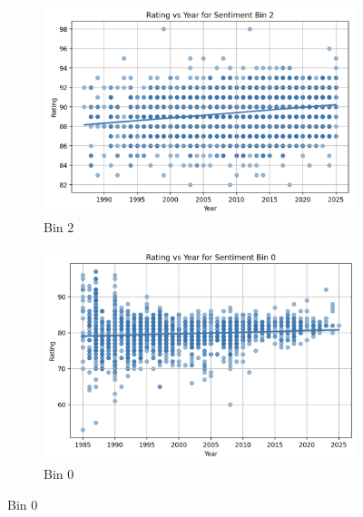 \documentclass{article}
\begin{document}
\begin{figure}[!ht]
    \vspace{0.5cm} %

    \begin{subfigure}[b]{0.45\linewidth}
        \centering
        \includegraphics[width=\linewidth]{Bin 2.png}
        \caption{Bin 2}
        \label{fig:bin2}
    \end{subfigure}
    \hfill
    \begin{subfigure}[b]{0.45\linewidth}
        \centering
        \includegraphics[width=\linewidth]{Bin 0.png}
        \caption{Bin 0}
        \label{fig:bin0}
    \end{subfigure}

    \vspace{0.5cm} %


\end{figure}
\end{document}
